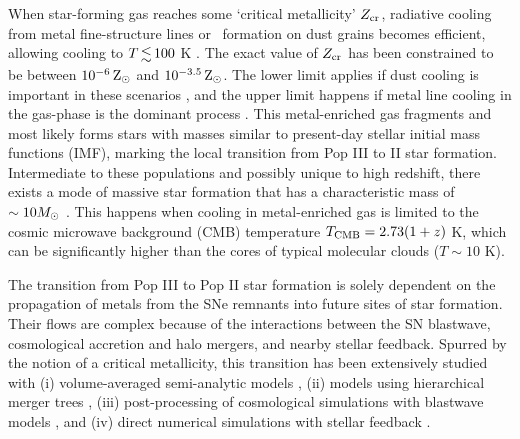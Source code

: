 \documentclass[useAMS,usenatbib]{mn2e}
\begin{document}
When star-forming gas reaches some `critical metallicity' $Z_{\rm
  cr}$, radiative cooling from metal fine-structure lines or
\hh~formation on dust grains becomes efficient, allowing cooling to $T
\la 100$ K \citep{Omukai05}.  The exact value of $Z_{\rm cr}$ has
been constrained to be between $10^{-6} {\rm\,Z_\odot}$ and $10^{-3.5} {\rm\,Z_\odot}$.
The lower limit applies if dust cooling is important in these
scenarios \citep{Omukai05, Schneider06_Frag, clark08}, and the upper
limit happens if metal line cooling in the gas-phase is the dominant
process \citep{Bromm01, 2009ApJ...691..441S}.  This metal-enriched gas
fragments and most likely forms stars with masses similar to
present-day stellar initial mass functions (IMF), marking the local
transition from Pop III to II star formation.  Intermediate to
these populations and possibly unique to high redshift, there exists a
mode of massive star formation that has a characteristic mass of $\sim
10 \Ms$ \citep{Larson98, Tumlinson07_IMF, 2009ApJ...691..441S}.  This
happens when cooling in metal-enriched gas is limited to the cosmic
microwave background (CMB) temperature $T_{\rm CMB} = 2.73 (1+z)$ K,
which can be significantly higher than the cores of typical molecular
clouds ($T \sim 10$ K).

The transition from Pop III to Pop II star formation is solely
dependent on the propagation of metals from the SNe remnants into
future sites of star formation.  Their flows are complex because of
the interactions between the SN blastwave, cosmological accretion and
halo mergers, and nearby stellar feedback.  Spurred by the notion of a
critical metallicity, this transition has been extensively studied
with (i) volume-averaged semi-analytic models \citep{Scannapieco03,
  Yoshida04, Furlanetto05_Reion}, (ii) models using hierarchical
merger trees \citep{Tumlinson06, Tumlinson10, Salvadori07, Komiya10},
(iii) post-processing of cosmological simulations with blastwave
models \citep{Karlsson08, Trenti09, Trenti10}, and (iv) direct
numerical simulations with stellar feedback \citep{Tornatore07,
  Ricotti08, Maio10_Pop32, Maio10_Enrich}.
\end{document}

